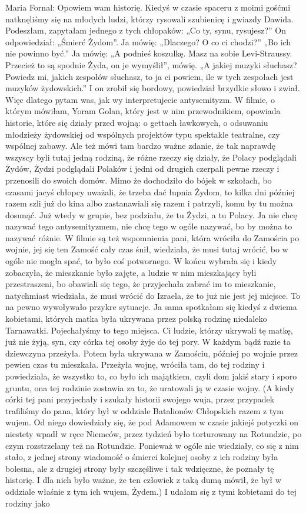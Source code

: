 {Maria Fornal: Opowiem wam historię. Kiedyś w czasie spaceru z moimi gośćmi natknęliśmy się na młodych ludzi, którzy rysowali szubienicę i gwiazdy Dawida. Podeszłam, zapytałam jednego z tych chłopaków: „Co ty, synu, rysujesz?” On odpowiedział: „Śmierć Żydom”. Ja mówię: „Dlaczego? O co ci chodzi?” „Bo ich nie powinno być.” Ja mówię: „A podnieś koszulkę. Masz na sobie Levi-Straussy. Przecież to są spodnie Żyda, on je wymyślił”, mówię. „A jakiej muzyki słuchasz? Powiedz mi, jakich zespołów słuchasz, to ja ci powiem, ile w tych zespołach jest muzyków żydowskich.” I on zrobił się bordowy, powiedział brzydkie słowo i zwiał. Więc dlatego pytam was, jak wy interpretujecie antysemityzm. W filmie, o którym mówiłam, Yoram Golan, który jest w nim przewodnikiem, opowiada historie, które się działy przed wojną: o gettach ławkowych, o odsuwaniu młodzieży żydowskiej od wspólnych projektów typu spektakle teatralne, czy wspólnej zabawy. Ale też mówi tam bardzo ważne zdanie, że tak naprawdę wszyscy byli tutaj jedną rodziną, że różne rzeczy się działy, że Polacy podglądali Żydów, Żydzi podglądali Polaków i jedni od drugich czerpali pewne rzeczy i przenosili do swoich domów. Mimo że dochodziło do bójek w szkołach, bo czasami jacyś chłopcy uważali, że trzeba dać łupnia Żydom, to kilka dni później razem szli już do kina albo zastanawiali się razem i patrzyli, komu by tu można dosunąć. Już wtedy w grupie, bez podziału, że tu Żydzi, a tu Polacy. Ja nie chcę nazywać tego antysemityzmem, nie chcę tego w ogóle nazywać, bo by można to nazywać różnie. W filmie są też wspomnienia pani, która wróciła do Zamościa po wojnie, jej się ten Zamość cały czas śnił, wiedziała, że musi tutaj wrócić, bo w ogóle nie mogła spać, to było coś potwornego. W końcu wybrała się i kiedy zobaczyła, że mieszkanie było zajęte, a ludzie w nim mieszkający byli przestraszeni, bo obawiali się tego, że przyjechała zabrać im to mieszkanie, natychmiast wiedziała, że musi wrócić do Izraela, że to już nie jest jej miejsce. To na pewno wywoływało przykre sytuacje. Ja sama spotkałam się kiedyś z dwiema kobietami, których matka była ukrywana przez polską rodzinę niedaleko Tarnawatki. Pojechałyśmy to tego miejsca. Ci ludzie, którzy ukrywali tę matkę, już nie żyją, syn, czy córka tej osoby żyje do tej pory. W każdym bądź razie ta dziewczyna przeżyła. Potem była ukrywana w Zamościu, później po wojnie przez pewien czas tu mieszkała. Przeżyła wojnę, wróciła tam, do tej rodziny i powiedziała, że wszystko to, co było ich majątkiem, czyli dom jakiś stary i sporo gruntu, ona tej rodzinie zostawia za to, że uratowali ją w czasie wojny. (A kiedy córki tej pani przyjechały i szukały historii swojego wuja, przez przypadek trafiliśmy do pana, który był w oddziale Batalionów Chłopskich razem z tym wujem. Od niego dowiedziały się, że pod Adamowem w czasie jakiejś potyczki on niestety wpadł w ręce Niemców, przez tydzień było torturowany na Rotundzie, po czym rozstrzelany też na Rotundzie. Ponieważ w ogóle nie wiedziały, co się z nim stało, z jednej strony wiadomość o śmierci kolejnej osoby z ich rodziny była bolesna, ale z drugiej strony były szczęśliwe i tak wdzięczne, że poznały tę historię. I dla nich było ważne, że ten człowiek z taką dumą mówił, że był w oddziale właśnie z tym ich wujem, Żydem.) I udałam się z tymi kobietami do tej rodziny jako }
